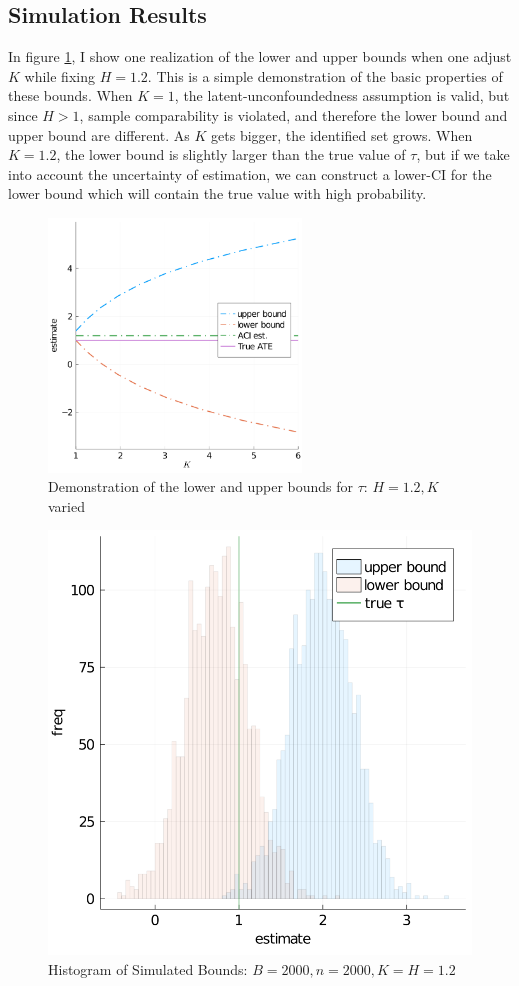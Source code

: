 \documentclass[12pt]{article}
\begin{document}
    \subsection{Simulation Results}
    
    In figure \ref{fig:fig1}, I show one realization of the lower and upper bounds when one adjust $K$ while fixing $H = 1.2$. This is a simple demonstration of the basic properties of these bounds. When $K = 1$, the latent-unconfoundedness assumption is valid, but since $H > 1$, sample comparability is violated, and therefore the lower bound and upper bound are different. As $K$ gets bigger, the identified set grows. When $K = 1.2$, the lower bound is slightly larger than the true value of $\tau$, but if we take into account the uncertainty of estimation, we can construct a lower-CI for the lower bound which will contain the true value with high probability.    
    
    \begin{figure}[!htbp]
        \centering
        \includegraphics[width=0.6\textwidth]{../code/fig1.png}
        \caption{Demonstration of the lower and upper bounds for $\tau$: $H = 1.2, K$ varied}
        \label{fig:fig1}
    \end{figure}
    
    \begin{figure}[!htbp]
        \centering
        \includegraphics[width = 0.6 \textwidth]{../code/fig2.png}
        \caption{Histogram of Simulated Bounds: $B = 2000, n = 2000, K = H = 1.2$}
        \label{fig:fig2}
    \end{figure}
\end{document}
